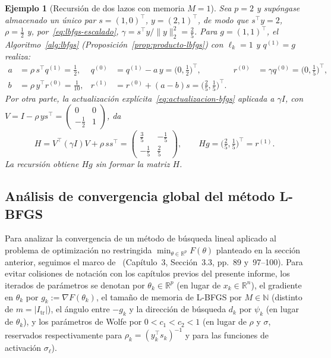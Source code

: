 \documentclass[a4paper,openany,oneside,10pt]{report}
\theoremstyle{pnlTeorema}
\theoremstyle{pnlDefinicion}
\theoremstyle{pnlObservacion}
\newtheorem{ejemplo}{Ejemplo}[section]
\begin{document}
\begin{ejemplo}[Recursión de dos lazos con memoria $M=1$]\label{ej:dos-lazos}
Sea $p=2$ y supóngase almacenado un único par $s=(1,0)^\top$, $y=(2,1)^\top$, de modo que $s^\top y=2$, $\rho=\frac12$ y, por~\eqref{eq:lbfgs-escalado}, $\gamma=s^\top y/\|y\|_2^2=\frac25$. Para $g=(1,1)^\top$, el Algoritmo~\ref{alg:lbfgs} (Proposición~\ref{prop:producto-lbfgs}) con $\ell_k=1$ y $q^{(1)}=g$ realiza:
\[
\begin{aligned}
a&=\rho\,s^\top q^{(1)}=\tfrac12, &
q^{(0)}&=q^{(1)}-a\,y=\bigl(0,\tfrac12\bigr)^\top, &
r^{(0)}&=\gamma q^{(0)}=\bigl(0,\tfrac15\bigr)^\top,\\
b&=\rho\,y^\top r^{(0)}=\tfrac1{10}, &
r^{(1)}&=r^{(0)}+(a-b)s=\bigl(\tfrac25,\tfrac15\bigr)^\top.
\end{aligned}
\]
Por otra parte, la actualización explícita~\eqref{eq:actualizacion-bfgs} aplicada a $\gamma I$, con $V=I-\rho\,y s^\top=\begin{pmatrix}0&0\\-\frac12&1\end{pmatrix}$, da
\[
H=V^\top(\gamma I)V+\rho\,ss^\top=\begin{pmatrix}\frac35&-\frac15\\[2pt]-\frac15&\frac25\end{pmatrix},
\qquad Hg=\bigl(\tfrac25,\tfrac15\bigr)^\top=r^{(1)}.
\]
La recursión obtiene $Hg$ sin formar la matriz $H$.
\end{ejemplo}


\subsection{Análisis de convergencia global del método L-BFGS}
\label{subsec:lbfgs-convergencia}

Para analizar la convergencia de un método de búsqueda lineal aplicado al
problema de optimización no restringida $\min_{\theta\in\mathbb{R}^p} F(\theta)$
planteado en la sección anterior, seguimos el marco de~\cite{andrei2020}
(Capítulo~3, Sección~3.3, pp.~89 y~97--100). Para evitar colisiones de notación
con los capítulos previos del presente informe, los iterados de parámetros se
denotan por $\theta_k\in\mathbb{R}^p$ (en lugar de $x_k\in\mathbb{R}^n$), el
gradiente en $\theta_k$ por $g_k:=\nabla F(\theta_k)$, el tamaño de memoria de
L-BFGS por $M\in\mathbb{N}$ (distinto de $m=|I_{\mathrm{tr}}|$), el ángulo entre
$-g_k$ y la dirección de búsqueda $d_k$ por $\psi_k$ (en lugar de $\theta_k$), y
los parámetros de Wolfe por $0<c_1<c_2<1$ (en lugar de $\rho$ y $\sigma$,
reservados respectivamente para $\rho_k=(y_k^\top s_k)^{-1}$ y para las
funciones de activación $\sigma_\ell$).
\end{document}
